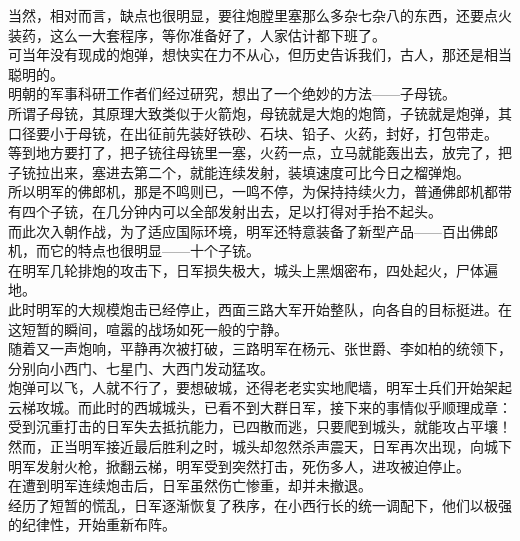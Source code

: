 \begin{multicols}{\theparacolNo}
当然，相对而言，缺点也很明显，要往炮膛里塞那么多杂七杂八的东西，还要点火装药，这么一大套程序，等你准备好了，人家估计都下班了。\\

可当年没有现成的炮弹，想快实在力不从心，但历史告诉我们，古人，那还是相当聪明的。\\

明朝的军事科研工作者们经过研究，想出了一个绝妙的方法——子母铳。\\

所谓子母铳，其原理大致类似于火箭炮，母铳就是大炮的炮筒，子铳就是炮弹，其口径要小于母铳，在出征前先装好铁砂、石块、铅子、火药，封好，打包带走。\\

等到地方要打了，把子铳往母铳里一塞，火药一点，立马就能轰出去，放完了，把子铳拉出来，塞进去第二个，就能连续发射，装填速度可比今日之榴弹炮。\\

所以明军的佛郎机，那是不鸣则已，一鸣不停，为保持持续火力，普通佛郎机都带有四个子铳，在几分钟内可以全部发射出去，足以打得对手抬不起头。\\

而此次入朝作战，为了适应国际环境，明军还特意装备了新型产品——百出佛郎机，而它的特点也很明显——十个子铳。\\

在明军几轮排炮的攻击下，日军损失极大，城头上黑烟密布，四处起火，尸体遍地。\\

此时明军的大规模炮击已经停止，西面三路大军开始整队，向各自的目标挺进。在这短暂的瞬间，喧嚣的战场如死一般的宁静。\\

随着又一声炮响，平静再次被打破，三路明军在杨元、张世爵、李如柏的统领下，分别向小西门、七星门、大西门发动猛攻。\\

炮弹可以飞，人就不行了，要想破城，还得老老实实地爬墙，明军士兵们开始架起云梯攻城。而此时的西城城头，已看不到大群日军，接下来的事情似乎顺理成章：受到沉重打击的日军失去抵抗能力，已四散而逃，只要爬到城头，就能攻占平壤！\\

然而，正当明军接近最后胜利之时，城头却忽然杀声震天，日军再次出现，向城下明军发射火枪，掀翻云梯，明军受到突然打击，死伤多人，进攻被迫停止。\\

在遭到明军连续炮击后，日军虽然伤亡惨重，却并未撤退。\\

经历了短暂的慌乱，日军逐渐恢复了秩序，在小西行长的统一调配下，他们以极强的纪律性，开始重新布阵。\\


\end{multicols}
